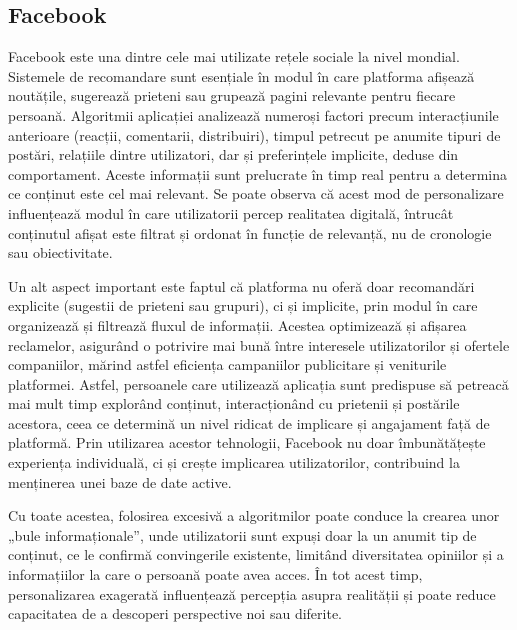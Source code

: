\subsection*{Facebook}
Facebook este una dintre cele mai utilizate rețele sociale la nivel mondial.
Sistemele de recomandare sunt esențiale în modul în care platforma afișează noutățile, sugerează prieteni sau grupează pagini relevante pentru fiecare persoană.
Algoritmii aplicației analizează numeroși factori precum interacțiunile anterioare (reacții, comentarii, distribuiri), timpul petrecut pe anumite tipuri de postări, relațiile dintre utilizatori, dar și preferințele implicite, deduse din comportament.
Aceste informații sunt prelucrate în timp real pentru a determina ce conținut este cel mai relevant. 
Se poate observa că acest mod de personalizare influențează modul în care utilizatorii percep realitatea digitală, întrucât conținutul afișat este filtrat și ordonat în funcție de relevanță, nu de cronologie sau obiectivitate\cite{baatarjav2008group}.
\par
Un alt aspect important este faptul că platforma nu oferă doar recomandări explicite (sugestii de prieteni sau grupuri), ci și implicite, prin modul în care organizează și filtrează fluxul de informații. 
Acestea optimizează și afișarea reclamelor, asigurând o potrivire mai bună între interesele utilizatorilor și ofertele companiilor, mărind astfel eficiența campaniilor publicitare și veniturile platformei.
Astfel, persoanele care utilizează aplicația sunt predispuse să petreacă mai mult timp explorând conținut, interacționând cu prietenii și postările acestora, ceea ce determină un nivel ridicat de implicare și angajament față de platformă.
Prin utilizarea acestor tehnologii, Facebook nu doar îmbunătățește experiența individuală, ci și crește implicarea utilizatorilor, contribuind la menținerea unei baze de date active\cite{heimbach2015value}.
\par
Cu toate acestea, folosirea excesivă a algoritmilor poate conduce la crearea unor „bule informaționale”\cite{nguyen2014exploring}, unde utilizatorii sunt expuși doar la un anumit tip de conținut, ce le confirmă convingerile existente, limitând diversitatea opiniilor și a informațiilor la care o persoană poate avea acces.
În tot acest timp, personalizarea exagerată influențează percepția asupra realității și poate reduce capacitatea de a descoperi perspective noi sau diferite.

